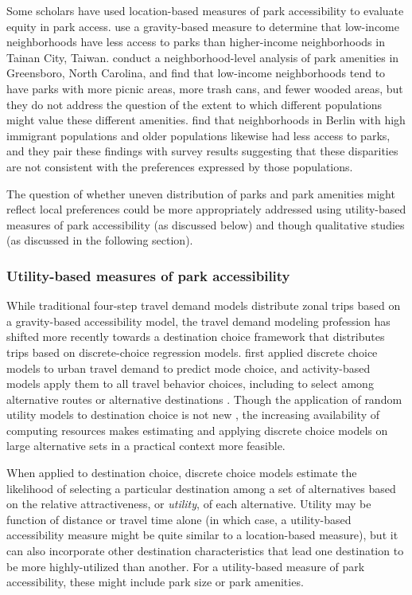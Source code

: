 \documentclass[]{elsarticle} %
\begin{document}
Some scholars have used location-based measures of park accessibility to
evaluate equity in park access. \citet{chang2011exploring} use a gravity-based measure
to determine that low-income neighborhoods have less access to parks than
higher-income neighborhoods in Tainan City, Taiwan. \citet{bruton2014disparities}
conduct a neighborhood-level analysis of park amenities in Greensboro, North
Carolina, and find that low-income neighborhoods tend to have parks with more
picnic areas, more trash cans, and fewer wooded areas, but they do not address
the question of the extent to which different populations might value these
different amenities. \citet{kabisch2014green} find that neighborhoods in Berlin with
high immigrant populations and older populations likewise had less access to
parks, and they pair these findings with survey results suggesting that these
disparities are not consistent with the preferences expressed by those
populations.

The question of whether uneven distribution of parks and park amenities might
reflect local preferences could be more appropriately addressed using
utility-based measures of park accessibility (as discussed below) and though
qualitative studies (as discussed in the following section).

\hypertarget{utility-based-measures-of-park-accessibility}{%
\subsubsection{Utility-based measures of park accessibility}\label{utility-based-measures-of-park-accessibility}}

While traditional four-step travel demand models distribute zonal trips based on
a gravity-based accessibility model, the travel demand modeling profession has
shifted more recently towards a destination choice framework that distributes
trips based on discrete-choice regression models. \citet{mcfadden1974measurement} first applied
discrete choice models to urban travel demand to predict mode choice, and
activity-based models apply them to all travel behavior choices, including to
select among alternative routes or alternative destinations \citep{de2011modelling}.
Though the application of random utility models to destination choice is not new
\citep[see][]{anas1983discrete}, the increasing availability of computing resources makes
estimating and applying discrete choice models on large alternative sets in a
practical context more feasible.

When applied to destination choice, discrete choice models estimate the
likelihood of selecting a particular destination among a set of alternatives
based on the relative attractiveness, or \emph{utility}, of each alternative. Utility
may be function of distance or travel time alone (in which case, a utility-based
accessibility measure might be quite similar to a location-based measure), but
it can also incorporate other destination characteristics that lead one
destination to be more highly-utilized than another. For a utility-based measure
of park accessibility, these might include park size or park amenities.
\end{document}
